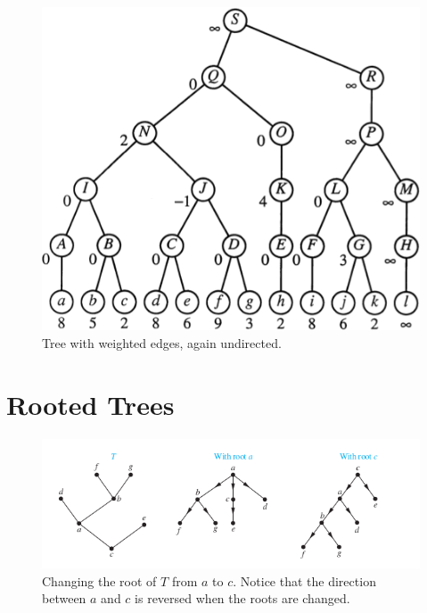 \documentclass[a4paper,10pt]{article}
\begin{document}
\begin{figure}[H]
	\begin{centering}
	\begin{center}
	\includegraphics[width=\linewidth]{./Pictures/topology-tree.png}
	\caption{Tree with weighted edges, again undirected.}
	\label{fig:toplogy}
	\end{center}
	\par\end{centering}
\end{figure}

\section{Rooted Trees}

\begin{figure}[h!]
	\begin{centering}
	\begin{center}
	\includegraphics[width=\linewidth]{./Pictures/changing_roots.png}
	\caption{Changing the root of $T$ from $a$ to $c$. Notice that the direction between $a$ and $c$ is reversed when the roots are changed.}
	\label{fig:changing_roots}
	\end{center}
	\par\end{centering}
\end{figure}
\end{document}
